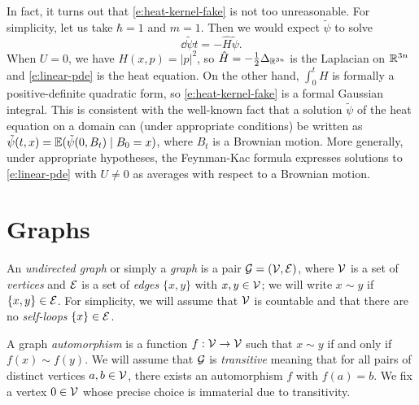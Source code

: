 \begin{rk}
In fact, it turns out that \eqref{e:heat-kernel-fake} is not too unreasonable.
For simplicity, let us take $\hbar = 1$ and $m = 1$.
Then we would expect $\tilde\psi$ to solve
\begin{equation}
\label{e:linear-pde}
\dd{\tilde\psi}{t} = -\hat H \tilde\psi.
\end{equation}
When $U = 0$, we have $H(x, p) = |p|^2$, so $\hat H = -\tfrac12 \Delta_{{\mathbb R}^{3n}}$
is the Laplacian on ${\mathbb R}^{3n}$ and \eqref{e:linear-pde} is the heat equation.
On the other hand, $\int_0^t H$ is formally a positive-definite quadratic form, so
\eqref{e:heat-kernel-fake} is a formal Gaussian integral. This is consistent
with the well-known fact that a solution $\tilde\psi$ of the heat equation
on a domain can (under appropriate conditions) be written as
$\tilde\psi(t, x) = \mathbb{E}(\tilde\psi(0, B_t) \mid B_0 = x)$,
where $B_t$ is a Brownian motion.
More generally, under appropriate hypotheses, the Feynman-Kac formula expresses
solutions to \eqref{e:linear-pde} with $U \ne 0$ as averages with respect to a
Brownian motion.
\end{rk}


\section{Graphs}
\label{sec:graphs}

An \emph{undirected graph} or simply a \emph{graph} is a pair $\mathcal{G} = (\mathcal{V}, \mathcal{E})$,
where $\mathcal{V}$
is a set of \emph{vertices} and $\mathcal{E}$ is a set of
\emph{edges} $\{ x, y \}$ with $x, y \in \mathcal{V}$; we will write $x \sim y$ if
$\{ x, y \} \in \mathcal{E}$.
For simplicity, we will assume that $\mathcal{V}$ is countable and that there are no
\emph{self-loops} $\{ x \} \in \mathcal{E}$.

A graph \emph{automorphism} is a function $f : \mathcal{V}\rightarrow\mathcal{V}$ such that
$x \sim y$ if and only if $f(x) \sim f(y)$.
We will assume that $\mathcal{G}$ is \emph{transitive} meaning that for all pairs
of distinct
vertices $a, b \in \mathcal{V}$, there exists an automorphism $f$ with $f(a) = b$.
We fix a vertex $0\in\mathcal{V}$ whose precise choice is immaterial due to
transitivity.


